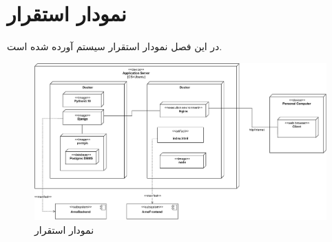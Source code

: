 

\chapter{نمودار استقرار}
\label{chapter:deploymentDiagram}

در این فصل نمودار استقرار سیستم آورده شده است.


\eject \pdfpagewidth=12in 

\begin{figure}[ht!]
	\centering
	\includegraphics[scale=0.8]{figs/OOD-deployment.pdf}
	\caption{نمودار استقرار}
\end{figure}
\FloatBarrier
\newpage



\recalctypearea
\newpage
